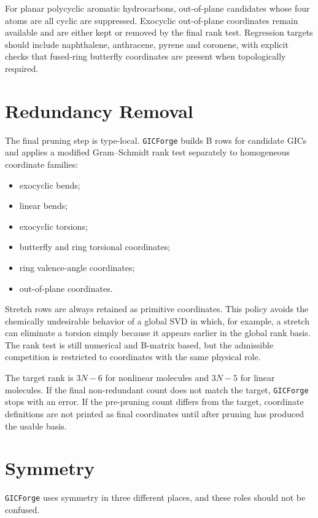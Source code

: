 \documentclass[11pt]{article}
\newcommand{\program}{\texttt{GICForge}}
\begin{document}
For planar polycyclic aromatic hydrocarbons, out-of-plane candidates whose four
atoms are all cyclic are suppressed.  Exocyclic out-of-plane coordinates remain
available and are either kept or removed by the final rank test.  Regression
targets should include naphthalene, anthracene, pyrene and coronene, with
explicit checks that fused-ring butterfly coordinates are present when
topologically required.

\section{Redundancy Removal}

The final pruning step is type-local.  \program{} builds B rows for candidate
GICs and applies a modified Gram--Schmidt rank test separately to homogeneous
coordinate families:

\begin{itemize}
  \item exocyclic bends;
  \item linear bends;
  \item exocyclic torsions;
  \item butterfly and ring torsional coordinates;
  \item ring valence-angle coordinates;
  \item out-of-plane coordinates.
\end{itemize}

\noindent
Stretch rows are always retained as primitive coordinates.  This policy avoids
the chemically undesirable behavior of a global SVD in which, for example, a
stretch can eliminate a torsion simply because it appears earlier in the global
rank basis.  The rank test is still numerical and B-matrix based, but the
admissible competition is restricted to coordinates with the same physical
role.

The target rank is \(3N-6\) for nonlinear molecules and \(3N-5\) for linear
molecules.  If the final non-redundant count does not match the target,
\program{} stops with an error.  If the pre-pruning count differs from the
target, coordinate definitions are not printed as final coordinates until after
pruning has produced the usable basis.

\section{Symmetry}

\program{} uses symmetry in three different places, and these roles should not
be confused.
\end{document}
